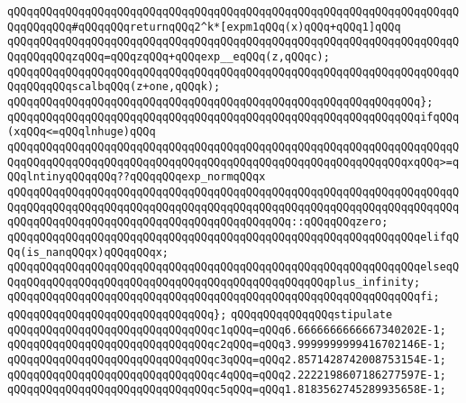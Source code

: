 \verb|qQQqqQQqqQQqqQQqqQQqqQQqqQQqqQQqqQQqqQQqqQQqqQQqqQQqqQQqqQQqqQQqqQQqqQQqqQQqqQQq#qQQqqQQqreturnqQQq2^k*[expm1qQQq(x)qQQq+qQQq1]qQQq|\newline
\verb|qQQqqQQqqQQqqQQqqQQqqQQqqQQqqQQqqQQqqQQqqQQqqQQqqQQqqQQqqQQqqQQqqQQqqQQqqQQqqQQqzqQQq=qQQqzqQQq+qQQqexp__eqQQq(z,qQQqc);|\newline
\verb|qQQqqQQqqQQqqQQqqQQqqQQqqQQqqQQqqQQqqQQqqQQqqQQqqQQqqQQqqQQqqQQqqQQqqQQqqQQqqQQqscalbqQQq(z+one,qQQqk);|\newline
\verb|qQQqqQQqqQQqqQQqqQQqqQQqqQQqqQQqqQQqqQQqqQQqqQQqqQQqqQQqqQQqqQQq};|\newline
\newline
\verb|qQQqqQQqqQQqqQQqqQQqqQQqqQQqqQQqqQQqqQQqqQQqqQQqqQQqqQQqqQQqqQQqifqQQq(xqQQq<=qQQqlnhuge)qQQq|\newline
\verb|qQQqqQQqqQQqqQQqqQQqqQQqqQQqqQQqqQQqqQQqqQQqqQQqqQQqqQQqqQQqqQQqqQQqqQQqqQQqqQQqqQQqqQQqqQQqqQQqqQQqqQQqqQQqqQQqqQQqqQQqqQQqqQQqqQQqxqQQq>=qQQqlntinyqQQqqQQq??qQQqqQQqexp_normqQQqx|\newline
\verb|qQQqqQQqqQQqqQQqqQQqqQQqqQQqqQQqqQQqqQQqqQQqqQQqqQQqqQQqqQQqqQQqqQQqqQQqqQQqqQQqqQQqqQQqqQQqqQQqqQQqqQQqqQQqqQQqqQQqqQQqqQQqqQQqqQQqqQQqqQQqqQQqqQQqqQQqqQQqqQQqqQQqqQQqqQQqqQQqqQQqqQQq::qQQqqQQqzero;|\newline
\verb|qQQqqQQqqQQqqQQqqQQqqQQqqQQqqQQqqQQqqQQqqQQqqQQqqQQqqQQqqQQqqQQqelifqQQq(is_nanqQQqx)qQQqqQQqx;|\newline
\verb|qQQqqQQqqQQqqQQqqQQqqQQqqQQqqQQqqQQqqQQqqQQqqQQqqQQqqQQqqQQqqQQqelseqQQqqQQqqQQqqQQqqQQqqQQqqQQqqQQqqQQqqQQqqQQqqQQqqQQqplus_infinity;|\newline
\verb|qQQqqQQqqQQqqQQqqQQqqQQqqQQqqQQqqQQqqQQqqQQqqQQqqQQqqQQqqQQqqQQqfi;|\newline
\verb|qQQqqQQqqQQqqQQqqQQqqQQqqQQqqQQq};|\newline
\newline
\verb|qQQqqQQqqQQqqQQqstipulate|\newline
\newline
\verb|qQQqqQQqqQQqqQQqqQQqqQQqqQQqqQQqc1qQQq=qQQq6.6666666666667340202E-1;|\newline
\verb|qQQqqQQqqQQqqQQqqQQqqQQqqQQqqQQqc2qQQq=qQQq3.9999999999416702146E-1;|\newline
\verb|qQQqqQQqqQQqqQQqqQQqqQQqqQQqqQQqc3qQQq=qQQq2.8571428742008753154E-1;|\newline
\verb|qQQqqQQqqQQqqQQqqQQqqQQqqQQqqQQqc4qQQq=qQQq2.2222198607186277597E-1;|\newline
\verb|qQQqqQQqqQQqqQQqqQQqqQQqqQQqqQQqc5qQQq=qQQq1.8183562745289935658E-1;|\newline
